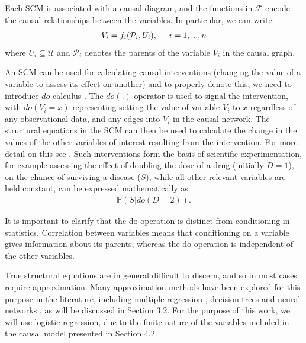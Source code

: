 \documentclass{article}
\begin{document}
\noindent Each SCM is associated with a causal diagram, and the functions in $\mathcal{F}$ encode the causal relationships between the variables. In particular, we can write: 
\begin{align}
    V_i = f_i(\mathcal{P}_i, U_i), \hspace{0.5cm} i = 1,...,n 
\end{align}
\noindent where $U_i \subseteq \mathcal{U}$ and $\mathcal{P}_i$ denotes the parents of the variable $V_i$ in the causal graph. 

An SCM can be used for calculating causal interventions (changing the value of a variable to assess its effect on another) and to properly denote this, we need to introduce $do$-calculus \cite{huang2012pearl}. The $do(.)$ operator is used to signal the intervention, with $do(V_i = x)$ representing setting the value of variable $V_i$ to $x$ regardless of any observational data, and any edges into $V_i$ in the causal network. The structural equations in the SCM can then be used to calculate the change in the values of the other variables of interest resulting from the intervention. For more detail on this see \cite{pearl2009causality}. Such interventions form the basis of scientific experimentation, for example assessing the effect of doubling the dose of a drug (initially $D=1$), on the chance of surviving a disease ($S)$, while all other relevant variables are held constant, can be expressed mathematically as:
\begin{align}
    \mathbb{P}(S| do(D = 2)).
\end{align}

\noindent It is important to clarify that the do-operation is distinct from conditioning in statistics. Correlation between variables means that conditioning on a variable gives information about its parents, whereas the do-operation is independent of the other variables.

True structural equations are in general difficult to discern, and so in most cases require approximation. Many approximation methods have been explored for this purpose in the literature, including multiple regression \cite{madumal2020explainable}, decision trees \cite{madumal2020distal} and neural networks \cite{wang2022causal}, as will be discussed in Section 3.2. For the purpose of this work, we will use logistic regression, due to the finite nature of the variables included in the causal model presented in Section 4.2.
\end{document}
